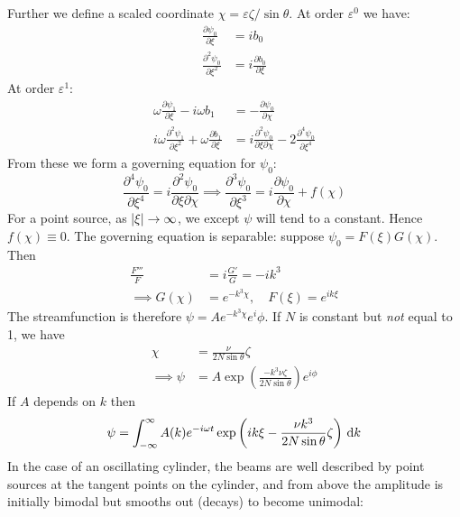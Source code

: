 \documentclass{jknotes}
\begin{document}
Further we define a scaled coordinate $\chi = \varepsilon \zeta / \sin
\theta$. At order $\varepsilon^0$ we have:
\begin{align}
	\frac{\partial \psi_0}{\partial \xi} &= ib_0 \\
	\frac{\partial^2 \psi_0}{\partial \xi^2} &= i \frac{\partial b_0}{\partial
	\xi} 
\end{align}
At order $\varepsilon^1$:
\begin{align}
	\omega \frac{\partial \psi_1}{\partial \xi} - i \omega b_1 &= -
\frac{\partial \psi_0}{\partial \chi} \\
i\omega \frac{\partial^2 \psi_1}{\partial \xi^2} + \omega \frac{\partial
b_1}{\partial \xi} &= i \frac{\partial^2 \psi_0}{\partial \xi \partial \chi} -
2 \frac{\partial^4 \psi_0}{\partial \xi^4}
\end{align}
From these we form a governing equation for $\psi_0$:
\begin{equation}
	\frac{\partial^4 \psi_0}{\partial \xi^4} = i \frac{\partial^2
	\psi_0}{\partial \xi \partial \chi} \implies \frac{\partial^3
\psi_0}{\partial \xi^3} = i \frac{\partial \psi_0}{\partial \chi} + f(\chi)
\end{equation}
For a point source, as $\abs{\xi} \to \infty$, we except $\psi$ will tend to a
constant. Hence $f(\chi) \equiv 0$. The governing equation is separable:
suppose $\psi_0 = F(\xi) G(\chi)$. Then
\begin{align}
	\frac{F'''}{F} &= i \frac{G'}{G} = -ik^3 \\
	\implies G(\chi) &= e^{-k^3 \chi}, \hspace{1em} F(\xi) = e^{ik\xi}
\end{align}
The streamfunction is therefore $\psi = Ae^{-k^3 \chi} e^i\phi$. If $N$ is
constant but \emph{not} equal to 1, we have
\begin{align}
	\chi &= \frac{\nu}{2N\sin\theta}\zeta \\
	\implies \psi &= A \exp \left( \frac{-k^3 \nu \zeta}{2N\sin\theta}\right)
	e^{i\phi}
\end{align}
If $A$ depends on $k$ then
\begin{equation}
	\psi = \int_{-\infty}^\infty A(k) e^{-i\omega t} \exp \left( ik\xi -
	\frac{\nu k^3}{2N\sin\theta} \zeta \right) \, \diffd k
\end{equation}
In the case of an oscillating cylinder, the beams are well described by point
sources at the tangent points on the cylinder, and from above the amplitude is
initially bimodal but smooths out (decays) to become unimodal:
\end{document}
